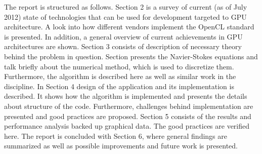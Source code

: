 The report is structured as follows. Section 2 is a survey of current (as of July 2012) state of technologies that can be used for development targeted to GPU architecture. A look into how different vendors implement the OpenCL standard is presented. In addition, a general overview of current achievements in GPU architectures are shown. Section 3 consists of description of necessary theory behind the problem in question. Section presents the Navier-Stokes equations and talk briefly about the numerical method, which is used to discretize them. Furthermore, the algorithm is described here as well as similar work in the discipline. In Section 4 design of the application and its implementation is described. It shows how the algorithm is implemented and presents the details about structure of the code. Furthermore, challenges behind implementation are presented and good practices are proposed. Section 5 consists of the results and performance analysis backed up graphical data. The good practices are verified here. The report is concluded with Section 6, where general findings are summarized as well as possible improvements and future work is presented.